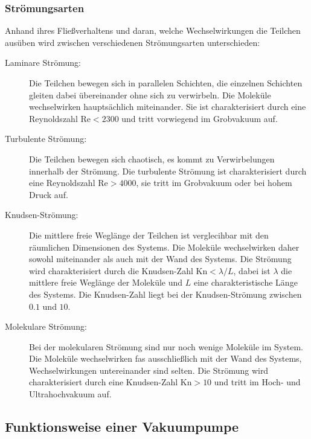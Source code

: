 \subsubsection{Strömungsarten}
Anhand ihres Fließverhaltens und daran, welche Wechselwirkungen die Teilchen ausüben wird zwischen verschiedenen Strömungsarten unterschieden:
\begin{description}
    \item[Laminare Strömung:] Die Teilchen bewegen sich in parallelen Schichten, die einzelnen Schichten gleiten dabei übereinander ohne sich zu verwirbeln.
    Die Moleküle wechselwirken hauptsächlich miteinander.
    Sie ist charakterisiert durch eine Reynoldszahl $\text{Re} < 2300$ und tritt vorwiegend im Grobvakuum auf.
    \item[Turbulente Strömung:] Die Teilchen bewegen sich chaotisch, es kommt zu Verwirbelungen innerhalb der Strömung. Die turbulente Strömung ist charakterisiert
    durch eine Reynoldszahl $\text{Re} > 4000$, sie tritt im Grobvakuum oder bei hohem Druck auf.
    \item[Knudsen-Strömung:] Die mittlere freie Weglänge der Teilchen ist verglecihbar mit den räumlichen Dimensionen des Systems. Die Moleküle wechselwirken daher sowohl miteinander
    als auch mit der Wand des Systems. Die Strömung wird charakterisiert durch die Knudsen-Zahl $\text{Kn} < \lambda / L$, dabei ist $\lambda$ die mittlere freie Weglänge der Moleküle
    und $L$ eine charakteristische Länge des Systems. Die Knudsen-Zahl liegt bei der Knudsen-Strömung zwischen $0.1$ und $10$.
    \item[Molekulare Strömung:] Bei der molekularen Strömung sind nur noch wenige Moleküle im System. Die Moleküle wechselwirken fas ausschließlich mit der Wand des Systems, 
    Wechselwirkungen untereinander sind selten. Die Strömung wird charakterisiert durch eine Knudsen-Zahl $\text{Kn} > 10$ und tritt im Hoch- und Ultrahochvakuum auf.
\end{description}
\cite{V070_glossar}
\subsection{Funktionsweise einer Vakuumpumpe}
